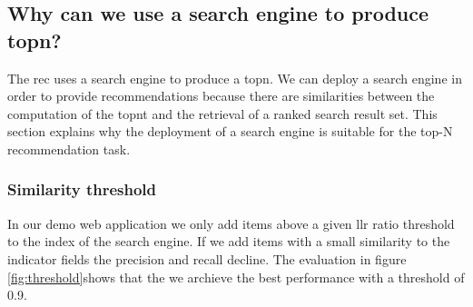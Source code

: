 \subsection{Why can we use a search engine to produce \gls{topn}?}
\label{sec:relation}

The \gls{rec} uses a search engine to produce a \gls{topn}. We can deploy a search engine in order to provide recommendations because there are similarities between the computation of the \gls{topnt} and the retrieval of a ranked search result set.
 This section explains why the deployment of a search engine is suitable for the top-N recommendation task.




\subsubsection{Similarity threshold}

In our demo web application we only add items above a given \gls{llr} ratio threshold to the index of the search engine. If we add items with a small similarity to the indicator fields the precision and recall decline. The evaluation in figure \ref{fig:threshold}shows that the we archieve the best performance with a threshold of 0.9.
